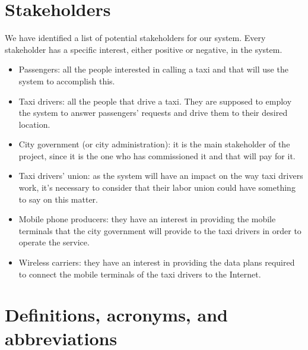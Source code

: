 \section{Stakeholders}
We have identified a list of potential stakeholders for our system. Every stakeholder has a specific interest, either positive or negative, in the system.
\begin{itemize}
\item Passengers: all the people interested in calling a taxi and that will use the system to accomplish this.
\item Taxi drivers: all the people that drive a taxi. They are supposed to employ the system to answer passengers' requests and drive them to their desired location.
\item City government (or city administration): it is the main stakeholder of the project, since it is the one who has commissioned it and that will pay for it.
\item Taxi drivers' union: as the system will have an impact on the way taxi drivers work, it's necessary to consider that their labor union could have something to say on this matter. 
\item Mobile phone producers: they have an interest in providing the mobile terminals that the city government will provide to the taxi drivers in order to operate the service. 
\item Wireless carriers: they have an interest in providing the data plans required to connect the mobile terminals of the taxi drivers to the Internet.
\end{itemize}


\section{Definitions, acronyms, and abbreviations}
